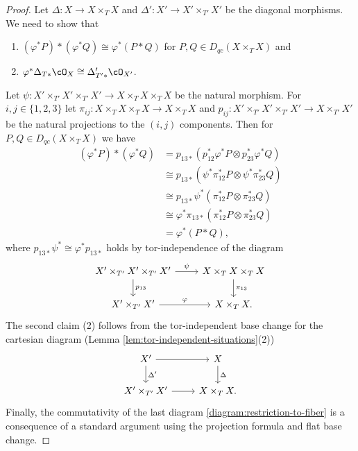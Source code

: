 \documentclass{amsart}
\numberwithin{equation}{section}
\theoremstyle{plain}
\theoremstyle{definition}
\begin{document}
\begin{proof}
    Let $\Delta \colon X \to X \times_T X$ and $\Delta' \colon X' \to X' \times_{T'} X'$ be the diagonal morphisms.
    We need to show that
    \begin{enumerate}
        \item $(\varphi^*P) * (\varphi^*Q) \cong \varphi^*(P*Q)$ for $P, Q \in D_{qc}(X \times_T X)$ and
        \item $\varphi^*\Delta_{T*}\cO_X \cong \Delta'_{T'*}\cO_{X'}$.
    \end{enumerate}
    Let $\psi \colon X' \times_{T'} X' \times_{T'} X' \to X \times_T X \times_T X$ be the natural morphism.
    For $i, j \in \{1, 2, 3\}$ let $\pi_{ij} \colon X \times_T X \times_T X \to X \times_T X$ and $p_{ij} \colon X' \times_{T'} X' \times_{T'} X' \to X \times_{T'} X'$ be the natural projections to the $(i, j)$ components.
    Then for $P, Q \in D_{qc}(X \times_T X)$ we have
    \begin{align}
        (\varphi^*P) * (\varphi^* Q) & =p_{13*}(p_{12}^* \varphi^* P \otimes p_{23}^* \varphi^* Q)   \\
                                     & \cong p_{13*}(\psi^*\pi_{12}^* P \otimes \psi^* \pi_{23}^* Q) \\
                                     & \cong p_{13*}\psi^*(\pi_{12}^* P \otimes \pi_{23}^* Q)        \\
                                     & \cong \varphi^*\pi_{13*}(\pi_{12}^* P \otimes \pi_{23}^* Q)   \\
                                     & = \varphi^*(P * Q),
    \end{align}
    where $p_{13*}\psi^* \cong \varphi^*p_{13*}$ holds by tor-independence of the diagram
    \[
        \begin{tikzcd}
            X' \times_{T'} X' \times_{T'} X' \ar[r, "\psi"] \ar[d, "p_{13}"] &  X \times_{T} X \times_{T} X \ar[d, "\pi_{13}"] \\
            X' \times_{T'} X' \ar[r, "\varphi"] & X \times_{T} X.
        \end{tikzcd}
    \]
    The second claim (2) follows from the tor-independent base change for the cartesian diagram (Lemma \ref{lem:tor-independent-situations}(2))
    \[
        \begin{tikzcd}
            X' \ar[r] \ar[d, "\Delta'"] &  X \ar[d, "\Delta"] \\
            X' \times_{T'} X' \ar[r] & X \times_{T} X.
        \end{tikzcd}
    \]
    Finally, the commutativity of the last diagram \eqref{diagram:restriction-to-fiber} is a consequence of a standard argument using the projection formula and flat base change.
\end{proof}
\end{document}
